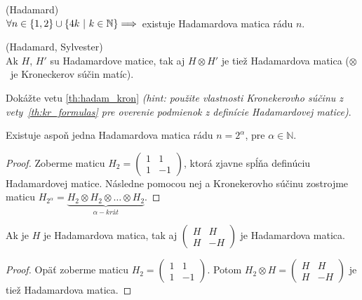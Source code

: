 \begin{hypothesis}{(Hadamard)}\\
$\forall n \in \left\{1, 2\right\} \cup \left\{4k ~|~ k \in \mathbb{N}\right\} \Longrightarrow$~existuje Hadamardova matica rádu $n$. 
\end{hypothesis}


\begin{theorem}{(Hadamard, Sylvester)}\\
\label{th:hadam_kron}
Ak $H$, $H'$ su Hadamardove matice, tak aj $H \otimes H'$ je tiež Hadamardova matica ($\otimes$~je Kroneckerov súčin matíc).
\end{theorem}

\begin{exercise}
Dokážte vetu \ref{th:hadam_kron} \emph{(hint: použite vlastnosti Kronekerovho súčinu z vety~\ref{th:kr_formulas} pre overenie podmienok z definície Hadamardovej matice)}.
\end{exercise}

\begin{corollary}
Existuje aspoň jedna Hadamardova matica rádu $n = 2^\alpha$, pre $\alpha \in \mathbb{N}$.
\end{corollary}

\begin{proof}
Zoberme maticu 
$ H_2 = \begin{pmatrix}
	1 & 1\\
	1 & -1
\end{pmatrix}$, ktorá zjavne spĺňa definúciu Hadamardovej matice.
Následne pomocou nej a Kronekerovho súčinu zostrojme maticu $ H_{2^\alpha} = \underbrace {H_2 \otimes H_2 \otimes \ldots \otimes H_2}_{\alpha - krát}$.
\end{proof}

\begin{corollary}
Ak je $H$ je Hadamardova matica, tak aj 
$ \begin{pmatrix}
	H & H\\
	H & -H
\end{pmatrix}$
je Hadamardova matica.
\end{corollary}

\begin{proof}
Opäť zoberme maticu
$ H_2 = \begin{pmatrix}
	1 & 1\\
	1 & -1
\end{pmatrix}$.
Potom $H_2 \otimes H = \begin{pmatrix}
	H & H\\
	H & -H
\end{pmatrix}$ je tiež Hadamardova matica.
\end{proof}

